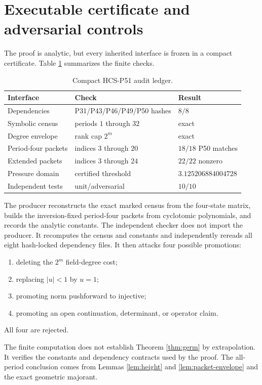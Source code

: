 \section{Executable certificate and adversarial controls}

The proof is analytic, but every inherited interface is frozen in a compact
certificate.  Table \ref{tab:certificate} summarizes the finite checks.

\begin{table}[htbp]
\centering
\begin{tabular}{@{}lll@{}}
\toprule
Interface & Check & Result\\
\midrule
Dependencies & P31/P43/P46/P49/P50 hashes & $8/8$\\
Symbolic census & periods $1$ through $32$ & exact\\
Degree envelope & rank cap $2^m$ & exact\\
Period-four packets & indices $3$ through $20$ & $18/18$ P50 matches\\
Extended packets & indices $3$ through $24$ & $22/22$ nonzero\\
Pressure domain & certified threshold & $3.125206884004728$\\
Independent tests & unit/adversarial & $10/10$\\
\bottomrule
\end{tabular}
\caption{Compact HCS-P51 audit ledger.}
\label{tab:certificate}
\end{table}

The producer reconstructs the exact marked census from the four-state
matrix, builds the inversion-fixed period-four packets from cyclotomic
polynomials, and records the analytic constants.  The independent checker
does not import the producer.  It recomputes the census and constants and
independently rereads all eight hash-locked dependency files.  It then
attacks four possible promotions:
\begin{enumerate}
\item deleting the $2^m$ field-degree cost;
\item replacing $|u|<1$ by $u=1$;
\item promoting norm pushforward to injective;
\item promoting an open continuation, determinant, or operator claim.
\end{enumerate}
All four are rejected.

The finite computation does not establish Theorem \ref{thm:germ} by
extrapolation.  It verifies the constants and dependency contracts used by
the proof.  The all-period conclusion comes from Lemmas
\ref{lem:height} and \ref{lem:packet-envelope} and the exact geometric
majorant.

